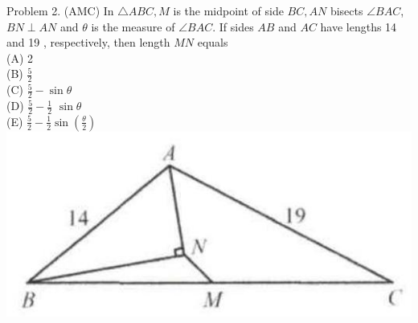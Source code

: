 \documentclass[10pt]{article}
\begin{document}
Problem 2. (AMC) In \(\triangle A B C, M\) is the midpoint of side \(B C, A N\) bisects \(\angle B A C\), \(B N \perp A N\) and \(\theta\) is the measure of \(\angle B A C\). If sides \(A B\) and \(A C\) have lengths 14 and 19 , respectively, then length \(M N\) equals\\
(A) 2\\
(B) \(\frac{5}{2}\)\\
(C) \(\frac{5}{2}-\sin \theta\)\\
(D) \(\frac{5}{2}-\frac{1}{2}\) \(\sin \theta\)\\
(E) \(\frac{5}{2}-\frac{1}{2} \sin \left(\frac{\theta}{2}\right)\)\\
\includegraphics[max width=\textwidth, center]{2025_04_17_97bc1f7e44d93c271a88g-064}
\end{document}
